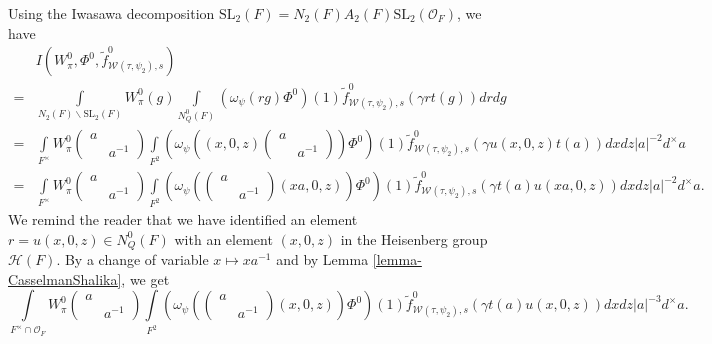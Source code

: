\documentclass[11pt]{amsart}
\theoremstyle{definition}
\theoremstyle{remark}
\begin{document}
Using the Iwasawa decomposition $\mathrm{SL}_2(F)=N_2(F)A_2(F)\mathrm{SL}_2(\mathcal{O}_F)$, we have
\begin{equation*}
\begin{split}
&I(W_\pi^0, \Phi^0, \tilde{f}^0_{\mathcal{W}(\tau,\psi_2), s} )\\
 =         &\int\limits_{N_2(F)\backslash \mathrm{SL}_2(F)} W_\pi^0(g) \int\limits_{N_Q^0(F)} \left(\omega_\psi(rg  )\Phi^0\right)(1) \tilde{f}_{\mathcal{W}(\tau,\psi_2), s} ^0 \left( \gamma r t(g)  \right) dr dg   \\
=     & \int\limits_{F^\times} W_\pi^0 \left(\begin{smallmatrix} a&\\ & a^{-1}\end{smallmatrix}\right) \int\limits_{F^2} \left(\omega_\psi \left( (x, 0, z)     \left(\begin{smallmatrix} a& \\&a^{-1}\end{smallmatrix}  \right)\right)\Phi^0\right)(1)     \tilde{f}_{\mathcal{W}(\tau,\psi_2), s} ^0 \left(\gamma u(x, 0, z) t(a)  \right)  dxdz  |a|^{-2} d^\times a  \\
=      &    \int\limits_{F^\times}  W_\pi^0 \left(\begin{smallmatrix} a&\\ & a^{-1}\end{smallmatrix}\right) \int\limits_{F^2} \left( \omega_\psi( \left(\begin{smallmatrix} a& \\&a^{-1}\end{smallmatrix} \right)  (xa, 0, z)     )\Phi^0\right)(1)     \tilde{f}_{\mathcal{W}(\tau,\psi_2), s} ^0 \left(\gamma t(a) u(xa, 0, z) \right)dxdz   |a|^{-2}  d^\times a.
\end{split}
\end{equation*}
We remind the reader that we have identified an element $r=u(x, 0, z)\in N_Q^0(F)$ with an element $(x, 0,z)$ in the Heisenberg group $\mathcal{H}(F)$.
By a change of variable $x\mapsto xa^{-1}$ and by Lemma \ref{lemma-CasselmanShalika}, we get
$$
 \int\limits_{F^\times\cap \mathcal{O}_F}  W_\pi^0 \left(\begin{smallmatrix} a&\\ & a^{-1}\end{smallmatrix}\right)       \int\limits_{F^2}  \left(\omega_\psi(  \left(\begin{smallmatrix} a& \\&a^{-1}\end{smallmatrix} \right)  (x, 0, z)  )\Phi^0\right)(1)     \tilde{f}_{\mathcal{W}(\tau,\psi_2), s} ^0 \left(\gamma t(a) u(x, 0, z)   \right)dxdz   |a|^{-3}  d^\times a.
$$
\end{document}
